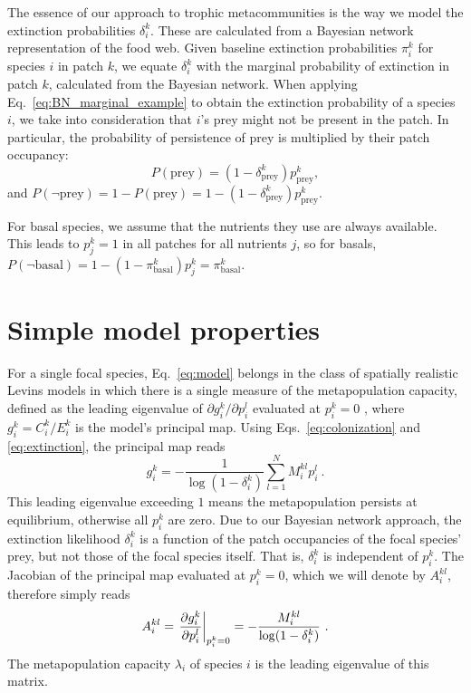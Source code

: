 \documentclass[11pt]{article}
\let\originalleft\left
\let\originalright\right
\renewcommand{\left}{\mathopen{}\mathclose\bgroup\originalleft}
\renewcommand{\right}{\aftergroup\egroup\originalright}
\begin{document}
The essence of our approach to trophic metacommunities is the way we model the extinction probabilities $\delta_i^k$. These are calculated from a Bayesian network representation of the food web. Given baseline extinction probabilities $\pi_i^k$ for species $i$ in patch $k$, we equate $\delta_i^k$ with the marginal probability of extinction in patch $k$, calculated from the Bayesian network. When applying Eq.~\ref{eq:BN_marginal_example} to obtain the extinction probability of a species $i$, we take into consideration that $i$'s prey might not be present in the patch. In particular, the probability of persistence of prey is multiplied by their patch occupancy:
\begin{equation}
  \label{eq:bayesprob}
  P(\text{prey}) = (1-\delta_\text{prey}^k) p_\text{prey}^k ,
\end{equation}
and $P(\neg \text{prey}) = 1 - P(\text{prey}) = 1 - (1 - \delta_\text{prey}^k) p_\text{prey}^k$.

For basal species, we assume that the nutrients they use are always available. This leads to $p_j^k = 1$ in all patches for all nutrients $j$, so for basals, $P(\neg \text{basal}) = 1 - (1 - \pi_\text{basal}^k)p_j^k = \pi_\text{basal}^k$.


\section{Simple model properties} \label{sec:simpleprops}

For a single focal species, Eq.~\ref{eq:model} belongs in the class of spatially realistic Levins models in which there is a single measure of the metapopulation capacity, defined as the leading eigenvalue of $\partial g_i^k / \partial p_i^l$ evaluated at $p_i^k = 0$ \citep{OvaskainenHanski2001}, where $g_i^k = C_i^k / E_i^k$ is the model's principal map. Using Eqs.~\ref{eq:colonization} and \ref{eq:extinction}, the principal map reads
\begin{equation}
  \label{eq:principalmap}
  g_i^k = -\frac{1}{\log(1 - \delta_i^k)} \sum_{l=1}^N M_i^{kl} p_i^l \ .
\end{equation}
 This leading eigenvalue exceeding $1$ means the metapopulation persists at equilibrium, otherwise all $p_i^k$ are zero. Due to our Bayesian network approach, the extinction likelihood $\delta_i^k$ is a function of the patch occupancies of the focal species' prey, but not those of the focal species itself. That is, $\delta_i^k$ is independent of $p_i^k$. The Jacobian of the principal map evaluated at $p_i^k = 0$, which we will denote by $A_i^{kl}$, therefore simply reads
\begin{equation}
  \label{eq:pmjac}
  A_i^{kl} = \left. \frac{\partial g_i^k}{\partial p_i^l} \right|_{p_i^k=0} =
  -\frac{M_i^{kl}}{\log(1 - \delta_i^k)} \ .
\end{equation}
The metapopulation capacity $\lambda_i$ of species $i$ is the leading eigenvalue of this matrix.
\end{document}
